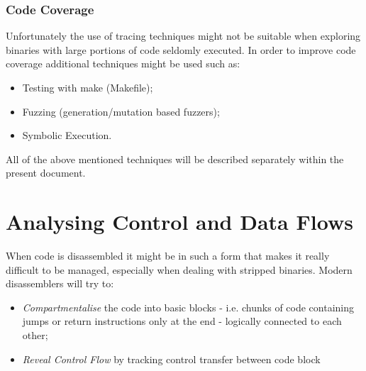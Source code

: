 \subsubsection{Code Coverage}
Unfortunately the use of tracing techniques might not be suitable when exploring binaries with large portions of code
seldomly executed.
In order to improve code coverage additional techniques might be used such as:
\begin{itemize}
    \item Testing with make (Makefile);
    \item Fuzzing (generation/mutation based fuzzers);
    \item Symbolic Execution.
\end{itemize}
All of the above mentioned techniques will be described separately within the present document.



\section{Analysing Control and Data Flows}
When code is disassembled it might be in such a form that makes it really difficult to be managed, especially when
dealing with stripped binaries. Modern disassemblers will try to:
\begin{itemize}
    \item \textit{Compartmentalise} the code into basic blocks - i.e. chunks of code containing jumps or return
        instructions only at the end - logically connected to each other;
    \item \textit{Reveal Control Flow} by tracking control transfer between code block
\end{itemize}


